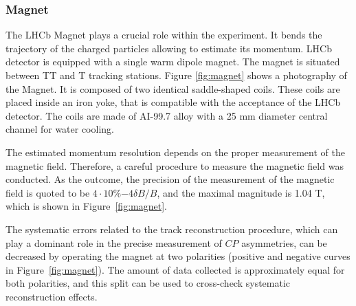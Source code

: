 \subsubsection{Magnet}

The LHCb Magnet plays a crucial role within the experiment. It bends the trajectory of the charged particles allowing to estimate its momentum. LHCb detector is equipped with a single warm dipole magnet. The magnet is situated between TT and T tracking stations. 
Figure \ref{fig:magnet} shows a photography of the Magnet. It is composed of two identical saddle-shaped coils. These coils are placed inside an iron yoke, that is compatible with the acceptance of the LHCb detector. The coils are made of AI-99.7 alloy with a 25 mm diameter central channel for water cooling. 

The estimated momentum resolution depends on the proper measurement of the magnetic field. Therefore, a careful procedure to measure the magnetic field was conducted. As the outcome, the precision of the measurement of the magnetic field is quoted to be $4 \cdot 10 \%{-4} \delta B /B $, and the maximal magnitude is 1.04 T, which is shown in Figure~\ref{fig:magnet}. 

The systematic errors related to the track reconstruction procedure, which can play a dominant role in the precise measurement of $CP$ asymmetries,  can be decreased by operating the magnet at two polarities (positive and negative curves in Figure~\ref{fig:magnet}). The amount of data collected is approximately equal for both polarities, and this split can be used to cross-check systematic reconstruction effects.

